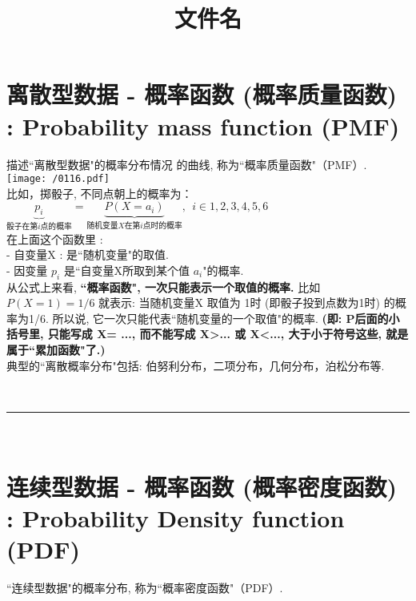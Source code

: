 \documentclass[UTF8]{ctexart}
\title{文件名}
\begin{document}
	\tableofcontents %
	\date{} %
	\maketitle  %
	
	
	
	
	\section{离散型数据 - 概率函数 (概率质量函数) : Probability mass function (PMF)}
	
	描述``离散型数据"的概率分布情况 的曲线, 称为``概率质量函数"（PMF）. \\
	
	\texttt{[image: /0116.pdf]} \\
	
	比如，掷骰子, 不同点朝上的概率为：$
	\underset{\text{骰子在第}i\text{点的概率}}{\underbrace{p_i}}=\underset{\text{随机变量}X\text{在第}i\text{点时的概率}}{\underbrace{P(X=a_i)}},\ \ i\in 1,2,3,4,5,6
	$ \\
	
	在上面这个函数里 : \\
	- 自变量X : 是``随机变量"的取值. \\
	- 因变量  $ p_i$ 是``自变量X所取到某个值 $a_i$"的概率. \\
	
	从公式上来看, \textbf{``概率函数", 一次只能表示一个取值的概率.} 比如 $ P(X=1)= 1/6$ 就表示: 当随机变量X 取值为 1时 (即骰子投到点数为1时) 的概率为1/6. 所以说, 它一次只能代表``随机变量的一个取值"的概率. \textbf{(即: P后面的小括号里, 只能写成 X= ..., 而不能写成 X>... 或 X<..., 大于小于符号这些, 就是属于``累加函数"了.)}\\
	
	
	
	典型的``离散概率分布"包括: 伯努利分布，二项分布，几何分布，泊松分布等. 
	
	
	~\\
	\hrule
	~\\
	
	
	\section{连续型数据 - 概率函数 (概率密度函数) : Probability Density function (PDF)}
	
	``连续型数据"的概率分布, 称为``概率密度函数"（PDF）.  \\
	
\end{document}
